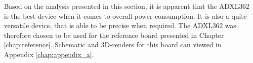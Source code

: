 Based on the analysis presented in this section, it is apparent that the ADXL362 is the best device when it comes to overall power consumption. It is also a quite versatile device, that is able to be precise when required. The ADXL362 was therefore chosen to be used for the reference board presented in Chapter \ref{chap:reference}. Schematic and 3D-renders for this board can viewed in Appendix \ref{chap:appendix_a}.